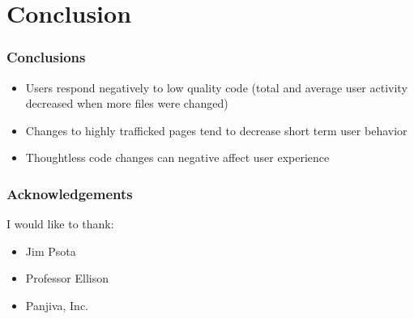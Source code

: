 \documentclass[xcolor=pdftex,dvipsnames,table]{beamer}
\begin{document}
\section{Conclusion}

\frame{\tableofcontents[currentsection]}

\frame
{
    \frametitle{Conclusions}
    \begin{itemize}
        \item Users respond negatively to low quality code (total and average user activity decreased when more files were changed)
        \item Changes to highly trafficked pages tend to decrease short term user behavior 
        \item Thoughtless code changes can negative affect user experience
    \end{itemize}
}

\frame
{
    \frametitle{Acknowledgements}
    I would like to thank:
    \begin{itemize}
        \item Jim Psota
        \item Professor Ellison
        \item Panjiva, Inc.
    \end{itemize}
}
\end{document}
